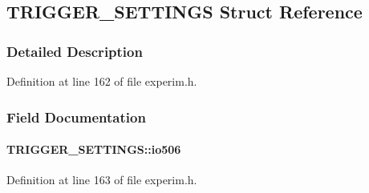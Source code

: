 \subsection{TRIGGER\_\-SETTINGS Struct Reference}
\label{structTRIGGER__SETTINGS}


\subsubsection{Detailed Description}


Definition at line 162 of file experim.h.

\subsubsection{Field Documentation}
\paragraph[{io506}]{ {\bf TRIGGER\_\-SETTINGS::io506}}\hfill\label{structTRIGGER__SETTINGS_af3ae64a30205264cde4accac53a8a8e7}


Definition at line 163 of file experim.h.